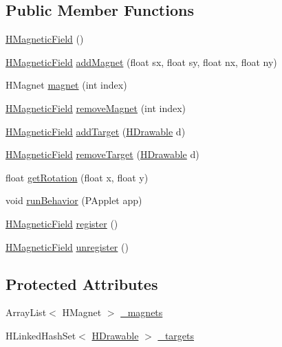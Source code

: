 \subsection*{Public Member Functions}
\begin{DoxyCompactItemize}
\item 
\hyperlink{classhype_1_1behavior_1_1_h_magnetic_field_a7fd048190786c4eb025b9df8bfcc2824}{H\-Magnetic\-Field} ()
\item 
\hyperlink{classhype_1_1behavior_1_1_h_magnetic_field}{H\-Magnetic\-Field} \hyperlink{classhype_1_1behavior_1_1_h_magnetic_field_a21df091feb3f8134f3aee78ef4d98bb6}{add\-Magnet} (float sx, float sy, float nx, float ny)
\item 
H\-Magnet \hyperlink{classhype_1_1behavior_1_1_h_magnetic_field_ad531d161393d9bc00ab67fa840a79798}{magnet} (int index)
\item 
\hyperlink{classhype_1_1behavior_1_1_h_magnetic_field}{H\-Magnetic\-Field} \hyperlink{classhype_1_1behavior_1_1_h_magnetic_field_a4940ac844de98bef6834b97b9ae81bdc}{remove\-Magnet} (int index)
\item 
\hyperlink{classhype_1_1behavior_1_1_h_magnetic_field}{H\-Magnetic\-Field} \hyperlink{classhype_1_1behavior_1_1_h_magnetic_field_a042ded466ff5b9ccd0746d4b8faabacb}{add\-Target} (\hyperlink{classhype_1_1drawable_1_1_h_drawable}{H\-Drawable} d)
\item 
\hyperlink{classhype_1_1behavior_1_1_h_magnetic_field}{H\-Magnetic\-Field} \hyperlink{classhype_1_1behavior_1_1_h_magnetic_field_af3af967e4ab6e1671994bb73f624ebe6}{remove\-Target} (\hyperlink{classhype_1_1drawable_1_1_h_drawable}{H\-Drawable} d)
\item 
float \hyperlink{classhype_1_1behavior_1_1_h_magnetic_field_ab753eb97970c81aa3654606b2635743b}{get\-Rotation} (float x, float y)
\item 
void \hyperlink{classhype_1_1behavior_1_1_h_magnetic_field_ae48e7966cb683687cd6a05ea8319ecbd}{run\-Behavior} (P\-Applet app)
\item 
\hyperlink{classhype_1_1behavior_1_1_h_magnetic_field}{H\-Magnetic\-Field} \hyperlink{classhype_1_1behavior_1_1_h_magnetic_field_ab7711de4588828606ed2590e1681279a}{register} ()
\item 
\hyperlink{classhype_1_1behavior_1_1_h_magnetic_field}{H\-Magnetic\-Field} \hyperlink{classhype_1_1behavior_1_1_h_magnetic_field_a3b17a1968dee1b61220256a06e10980f}{unregister} ()
\end{DoxyCompactItemize}
\subsection*{Protected Attributes}
\begin{DoxyCompactItemize}
\item 
Array\-List$<$ H\-Magnet $>$ \hyperlink{classhype_1_1behavior_1_1_h_magnetic_field_a571dc191ead43a576513fb710a184bb4}{\-\_\-magnets}
\item 
H\-Linked\-Hash\-Set$<$ \hyperlink{classhype_1_1drawable_1_1_h_drawable}{H\-Drawable} $>$ \hyperlink{classhype_1_1behavior_1_1_h_magnetic_field_a2d6fe89f3ad7910e52f5af6f3d2b8c26}{\-\_\-targets}
\end{DoxyCompactItemize}


